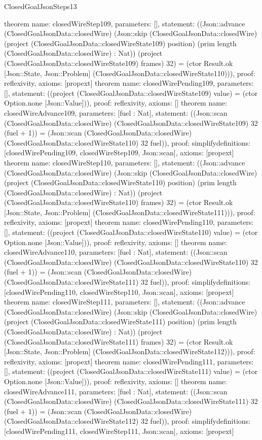 \begin{lexlean}{ClosedGoalJsonSteps13}
\begin{semanticmodule}
{}
theorem{
 name: closedWireStep109, parameters: [],
 statement: ((Json::advance (ClosedGoalJsonData::closedWire) (Json::skip (ClosedGoalJsonData::closedWire) (project (ClosedGoalJsonData::closedWireState109) position) (prim length (ClosedGoalJsonData::closedWire) : Nat)) (project (ClosedGoalJsonData::closedWireState109) frames) 32) = (ctor Result.ok [Json::State, Json::Problem] (ClosedGoalJsonData::closedWireState110))), proof: reflexivity{}, axioms: [propext]
}
theorem{
 name: closedWirePending109, parameters: [],
 statement: ((project (ClosedGoalJsonData::closedWireState109) value) = (ctor Option.none [Json::Value])), proof: reflexivity{}, axioms: []
}
theorem{
 name: closedWireAdvance109, parameters: [fuel : Nat],
 statement: ((Json::scan (ClosedGoalJsonData::closedWire) (ClosedGoalJsonData::closedWireState109) 32 (fuel + 1)) = (Json::scan (ClosedGoalJsonData::closedWire) (ClosedGoalJsonData::closedWireState110) 32 fuel)), proof: simplify{definitions: [closedWirePending109, closedWireStep109, Json::scan]}, axioms: [propext]
}
theorem{
 name: closedWireStep110, parameters: [],
 statement: ((Json::advance (ClosedGoalJsonData::closedWire) (Json::skip (ClosedGoalJsonData::closedWire) (project (ClosedGoalJsonData::closedWireState110) position) (prim length (ClosedGoalJsonData::closedWire) : Nat)) (project (ClosedGoalJsonData::closedWireState110) frames) 32) = (ctor Result.ok [Json::State, Json::Problem] (ClosedGoalJsonData::closedWireState111))), proof: reflexivity{}, axioms: [propext]
}
theorem{
 name: closedWirePending110, parameters: [],
 statement: ((project (ClosedGoalJsonData::closedWireState110) value) = (ctor Option.none [Json::Value])), proof: reflexivity{}, axioms: []
}
theorem{
 name: closedWireAdvance110, parameters: [fuel : Nat],
 statement: ((Json::scan (ClosedGoalJsonData::closedWire) (ClosedGoalJsonData::closedWireState110) 32 (fuel + 1)) = (Json::scan (ClosedGoalJsonData::closedWire) (ClosedGoalJsonData::closedWireState111) 32 fuel)), proof: simplify{definitions: [closedWirePending110, closedWireStep110, Json::scan]}, axioms: [propext]
}
theorem{
 name: closedWireStep111, parameters: [],
 statement: ((Json::advance (ClosedGoalJsonData::closedWire) (Json::skip (ClosedGoalJsonData::closedWire) (project (ClosedGoalJsonData::closedWireState111) position) (prim length (ClosedGoalJsonData::closedWire) : Nat)) (project (ClosedGoalJsonData::closedWireState111) frames) 32) = (ctor Result.ok [Json::State, Json::Problem] (ClosedGoalJsonData::closedWireState112))), proof: reflexivity{}, axioms: [propext]
}
theorem{
 name: closedWirePending111, parameters: [],
 statement: ((project (ClosedGoalJsonData::closedWireState111) value) = (ctor Option.none [Json::Value])), proof: reflexivity{}, axioms: []
}
theorem{
 name: closedWireAdvance111, parameters: [fuel : Nat],
 statement: ((Json::scan (ClosedGoalJsonData::closedWire) (ClosedGoalJsonData::closedWireState111) 32 (fuel + 1)) = (Json::scan (ClosedGoalJsonData::closedWire) (ClosedGoalJsonData::closedWireState112) 32 fuel)), proof: simplify{definitions: [closedWirePending111, closedWireStep111, Json::scan]}, axioms: [propext]
}
\end{semanticmodule}
\end{lexlean}
